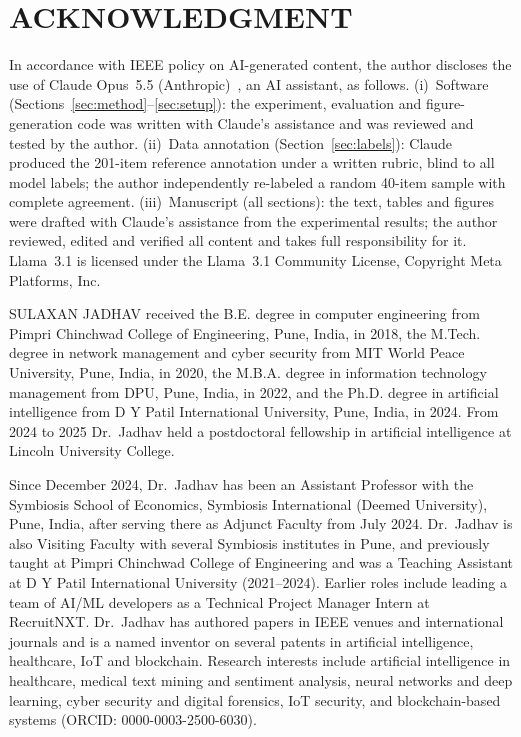 \documentclass{ieeetj}
\begin{document}
\section*{ACKNOWLEDGMENT}
In accordance with IEEE policy on AI-generated content, the author discloses the use of Claude Opus~5.5 (Anthropic)~\cite{anthropic2026claude}, an AI assistant, as follows. (i)~Software (Sections~\ref{sec:method}--\ref{sec:setup}): the experiment, evaluation and figure-generation code was written with Claude's assistance and was reviewed and tested by the author. (ii)~Data annotation (Section~\ref{sec:labels}): Claude produced the 201-item reference annotation under a written rubric, blind to all model labels; the author independently re-labeled a random 40-item sample with complete agreement. (iii)~Manuscript (all sections): the text, tables and figures were drafted with Claude's assistance from the experimental results; the author reviewed, edited and verified all content and takes full responsibility for it. Llama~3.1 is licensed under the Llama~3.1 Community License, Copyright \textcopyright{} Meta Platforms, Inc.




\begin{IEEEbiographynophoto}{SULAXAN JADHAV}
received the B.E. degree in computer engineering from Pimpri Chinchwad College of Engineering, Pune, India, in 2018, the M.Tech. degree in network management and cyber security from MIT World Peace University, Pune, India, in 2020, the M.B.A. degree in information technology management from DPU, Pune, India, in 2022, and the Ph.D. degree in artificial intelligence from D Y Patil International University, Pune, India, in 2024. From 2024 to 2025 Dr.~Jadhav held a postdoctoral fellowship in artificial intelligence at Lincoln University College.

Since December 2024, Dr.~Jadhav has been an Assistant Professor with the Symbiosis School of Economics, Symbiosis International (Deemed University), Pune, India, after serving there as Adjunct Faculty from July 2024. Dr.~Jadhav is also Visiting Faculty with several Symbiosis institutes in Pune, and previously taught at Pimpri Chinchwad College of Engineering and was a Teaching Assistant at D Y Patil International University (2021--2024). Earlier roles include leading a team of AI/ML developers as a Technical Project Manager Intern at RecruitNXT. Dr.~Jadhav has authored papers in IEEE venues and international journals and is a named inventor on several patents in artificial intelligence, healthcare, IoT and blockchain. Research interests include artificial intelligence in healthcare, medical text mining and sentiment analysis, neural networks and deep learning, cyber security and digital forensics, IoT security, and blockchain-based systems (ORCID: 0000-0003-2500-6030).
\end{IEEEbiographynophoto}

\vfill\pagebreak
\end{document}
